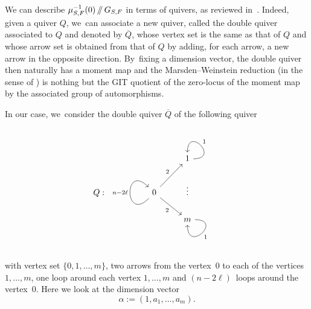 \documentclass[JEP,XML,SOM,Unicode,published]{cedram}
\providecommand\sslash{\mathop{/\mkern-5.5mu/}}
\theoremstyle{definition}
\begin{document}
We can describe $\mu^{-1}_{S,F}(0)\sslash G_{S,F}$ in terms of quivers, as reviewed in~\cite[\S 4]{AS:Formality}.
Indeed, given a quiver $Q$, we~can associate a new quiver, called the double quiver associated to $Q$ and denoted by $\overline{Q}$, whose vertex set is the same as that of $Q$ and whose arrow set is obtained from that of $Q$ by adding, for each arrow, a new arrow in the opposite direction. By~fixing a dimension vector, the double quiver then naturally has a moment map and the Marsden--Weinstein reduction (in the sense of \hbox{\cite[\S 1]{CB:normality}}) is nothing but the GIT quotient of the zero-locus of the moment map by the associated group of automorphisms.

In our case, we~consider the double quiver $\overline{Q}$ of the following quiver
\[
\begin{tikzcd}
&&& 1 \arrow[out=0,in=90,loop,swap,"1"]\\
Q:&& 0 \arrow[out=-135,in=135,loop,"n-2\ell"]\arrow[ur,"2"]\arrow[dr,swap,"2"]&\vdots\\
&&& m \arrow[out=0,in=-90,loop,"1"]
\end{tikzcd}
\]
with vertex set $\{0,1,\dots,m\}$, two arrows from the vertex~0 to each of the vertices $1,\dots,m$, one loop around each vertex $1,\dots,m$ and $(n-2\ell)$~loops around the vertex~0.
Here we look at the dimension vector
\[
\alpha:=(1,a_1,\dots,a_m).
\]
\end{document}
